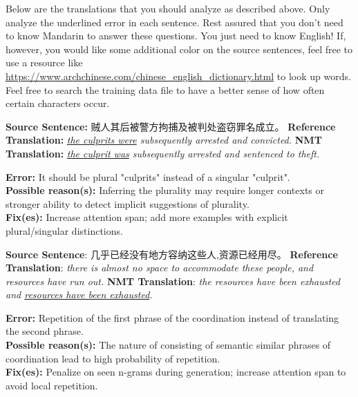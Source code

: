 \begin{parts}
    Below are the translations that you should analyze as described above. Only analyze the underlined error in each sentence. Rest assured that you don't need to know Mandarin to answer these questions. You just need to know English! If, however, you would like some additional color on the source sentences, feel free to use a resource like \url{https://www.archchinese.com/chinese_english_dictionary.html} to look up words. Feel free to search the training data file to have a better sense of how often certain characters occur.

    \begin{subparts}
        \subpart[2]
        \textbf{Source Sentence:} 贼人其后被警方拘捕及被判处盗窃罪名成立。 \newline
        \textbf{Reference Translation:} \textit{\underline{the culprits were} subsequently arrested and convicted.}\newline
        \textbf{NMT Translation:} \textit{\underline{the culprit was} subsequently arrested and sentenced to theft.}
        
        \ifans{} \textbf{Error:} It should be plural "culprits" instead of a singular "culprit".\\
        \textbf{Possible reason(s):} Inferring the plurality may require longer contexts or stronger ability to detect implicit suggestions of plurality.\\
        \textbf{Fix(es):} Increase attention span; add more examples with explicit plural/singular distinctions.

        \subpart[2]
        \textbf{Source Sentence}: 几乎已经没有地方容纳这些人,资源已经用尽。\newline
        \textbf{Reference Translation}: \textit{there is almost no space to accommodate these people, and resources have run out.   }\newline
        \textbf{NMT Translation}: \textit{the resources have been exhausted and \underline{resources have been exhausted}.}
        
        \ifans{} \textbf{Error:} Repetition of the first phrase of the coordination instead of translating the second phrase.\\
        \textbf{Possible reason(s):} The nature of consisting of semantic similar phrases of coordination lead to high probability of repetition.\\
        \textbf{Fix(es):} Penalize on seen n-grams during generation; increase attention span to avoid local repetition.


\end{subparts}
\end{parts}
